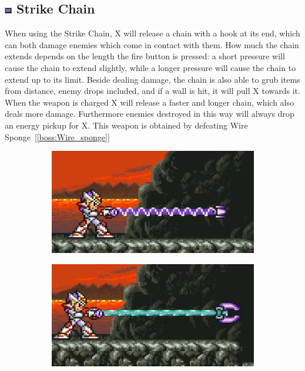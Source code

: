 \subsection{\includegraphics[width=12px, height=10px]{figures/X2/weapons/S_chain.png} Strike Chain}\label{Strike_chain}
When using the Strike Chain, X will release a chain with a hook at its end, which can both damage enemies which come in contact with them. How much the chain extends depends on the length the fire button is pressed: a short pressure will cause the chain to extend slightly, while a longer pressure will cause the chain to extend up to its limit. Beside dealing damage, the chain is also able to grub items from distance, enemy drops included, and if a wall is hit, it will pull X towards it. When the weapon is charged X will release a faster and longer chain, which also deals more damage. Furthermore enemies destroyed in this way will always drop an energy pickup for X. This weapon is obtained by defeating Wire Sponge~[\ref{boss:Wire_sponge}]

\begin{figure}[htp]
	\centering
	\begin{subfigure}{0.45\linewidth}
		\includegraphics[width=\linewidth]{figures/X2/weapons/S_chain_1.png}	
	\end{subfigure}
	\begin{subfigure}{0.45\linewidth}
		\centering
		\includegraphics[width=\linewidth]{figures/X2/weapons/S_chain_2.png}	
	\end{subfigure}
\end{figure}

